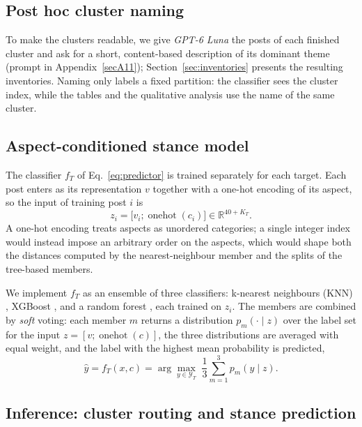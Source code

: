 \documentclass[pdflatex,sn-mathphys-num,iicol]{sn-jnl}%
\begin{document}
\subsection{Post hoc cluster naming}\label{subsec45}

To make the clusters readable, we give \textit{GPT-6 Luna} the posts of each finished cluster and ask for a short, content-based description of its dominant theme (prompt in Appendix~\ref{secA11}); Section~\ref{sec:inventories} presents the resulting inventories. Naming only labels a fixed partition: the classifier sees the cluster index, while the tables and the qualitative analysis use the name of the same cluster.

\subsection{Aspect-conditioned stance model}\label{subsec46}

The classifier \(f_T\) of Eq.~\eqref{eq:predictor} is trained separately for each target. Each post enters as its representation \(v\) together with a one-hot encoding of its aspect, so the input of training post \(i\) is
\begin{equation}\label{eq:input}
z_i = \bigl[v_i; \operatorname{onehot}(c_i)\bigr] \in \mathbb{R}^{40 + K_T}.
\end{equation}
A one-hot encoding treats aspects as unordered categories; a single integer index would instead impose an arbitrary order on the aspects, which would shape both the distances computed by the nearest-neighbour member and the splits of the tree-based members.

We implement \(f_T\) as an ensemble of three classifiers: k-nearest neighbours (KNN) \cite{cover1967nearest}, XGBoost \cite{chen2016xgboost}, and a random forest \cite{breiman2001random}, each trained on \(z_i\). The members are combined by \emph{soft} voting: each member \(m\) returns a distribution \(p_m(\cdot \mid z)\) over the label set for the input \mbox{\(z = [v; \operatorname{onehot}(c)]\)}, the three distributions are averaged with equal weight, and the label with the highest mean probability is predicted,
\begin{equation}\label{eq:vote}
\hat{y} = f_T(x, c) = \arg\max_{y \in \mathcal{Y}_T} \; \frac{1}{3}\sum_{m=1}^{3} p_m(y \mid z).
\end{equation}

\subsection{Inference: cluster routing and stance prediction}\label{subsec47}
\end{document}
